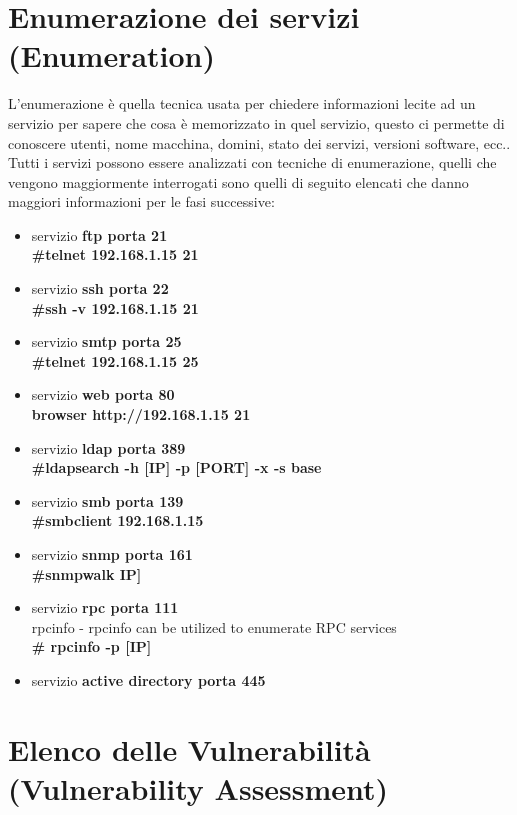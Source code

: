 \documentclass[a4paper,12pt]{article}
\begin{document}
\section{ Enumerazione  dei servizi (Enumeration)}

L'enumerazione è quella tecnica usata per chiedere informazioni lecite ad un servizio per sapere che cosa è memorizzato in quel servizio, questo ci permette di conoscere utenti,  nome macchina, domini, stato dei servizi, versioni software, ecc..
Tutti i servizi possono essere analizzati con tecniche di enumerazione, quelli che vengono maggiormente interrogati sono quelli di seguito elencati che danno maggiori informazioni per le fasi successive:
\begin{itemize}

    \item servizio\textbf{ ftp porta 21} \\
        \textbf{ \#telnet  192.168.1.15 21}
    \item servizio \textbf{ssh porta 22} \\
        \textbf{ \#ssh -v 192.168.1.15 21}
    \item servizio \textbf{smtp porta 25} \\
        \textbf{ \#telnet  192.168.1.15 25}
     \item servizio \textbf{web porta 80} \\
        \textbf{ browser http://192.168.1.15 21}
    \item servizio \textbf{ldap porta 389} \\
        \textbf{ \#ldapsearch -h [IP] -p [PORT] -x -s base}
    \item servizio\textbf{ smb porta 139} \\
        \textbf{ \#smbclient 192.168.1.15}
    \item servizio\textbf{ snmp porta 161} \\
         \textbf{ \#snmpwalk IP]}
     \item servizio\textbf{ rpc porta 111} \\
        rpcinfo - rpcinfo can be utilized to enumerate RPC services \\
        \textbf{ \# rpcinfo -p [IP]}
    \item servizio\textbf{ active directory porta 445}
\end{itemize}

\section{ Elenco delle Vulnerabilità (Vulnerability Assessment) }
\end{document}
